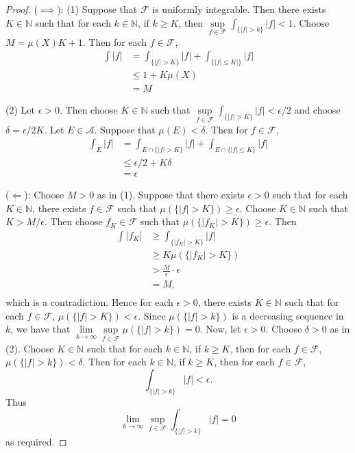 \documentclass[12pt]{amsart}
\theoremstyle{definition}
\newcommand{\del}{\delta}
\newcommand{\ep}{\epsilon}
\newcommand{\N}{\mathbb{N}}
\newcommand{\MA}{\mathcal{A}}
\newcommand{\MF}{\mathcal{F}}
\begin{document}
	\begin{proof}
		($\implies$): (1) Suppose that $\MF$ is uniformly integrable. Then there exists $K \in \N$ such that for each $k \in \N$, if $k \geq K$, then $\sup\limits_{f \in \MF} \int_{\{|f|>k\}} |f| < 1$. Choose $M = \mu(X)K + 1$. Then for each $f \in \MF$, 
		\begin{align*}
			\int |f| 
			&= \int_{\{|f|>K\}} |f| + \int_{\{|f| \leq K|\}}|f|\\
			& \leq 1 + K\mu(X)\\
			&=M
		\end{align*}
		
		(2) Let $\ep >0$. Then choose $K \in \N$ such that $\sup\limits_{f \in \MF}\int_{\{|f|>K\}} |f| < \ep/2$ and choose $\del = \ep/2K$. Let $E \in \MA$. Suppose that $\mu(E) < \del$. Then for $f \in \MF$, 
		\begin{align*}
			\int_E |f| 
			&= \int_{E \cap \{|f| > K\}} |f| + \int_{E \cap \{|f| \leq K\}} |f|\\
			& \leq \ep/2 + K\del \\
			&=  \ep
		\end{align*}
		
		($\Leftarrow$): Choose $M >0$ as in (1). Suppose that there exists $\ep >0$ such that for each $K \in \N$, there exists $f \in \MF$ such that $\mu(\{|f| > K\}) \geq \ep$. Choose $K \in \N$ such that $K > M/\ep$. Then choose $f_K \in \MF$ such that $\mu(\{|f_K| > K\}) \geq \ep$. Then 
		\begin{align*}
			\int |f_K| 
			&\geq \int_{\{|f_K| > K\}} |f|\\
			& \geq K\mu(\{|f_K| > K\})\\
			& > \frac{M}{\ep} \cdot \ep\\
			&= M, \\
		\end{align*}  
		which is a contradiction. Hence for each $\ep >0$, there exists $K \in \N$ such that for each $f \in \MF$, $\mu(\{|f| > K\}) < \ep$. Since $\mu(\{|f| > k\})$ is a decreasing sequence in $k$, we have that $\lim\limits_{k \rightarrow \infty} \sup\limits_{f \in \MF} \mu(\{|f| > k\}) = 0$. Now, let $\ep > 0$. Choose $\del >0$ as in (2). Choose $K \in \N$ such that for each $k \in \N$, if $k \geq K$, then for each $f \in \MF$, $\mu(\{|f| > k\}) < \del$. Then for each $k \in \N$, if $k \geq K$, then for each $f \in \MF$, 
		$$\int_{\{|f| > k\}} |f| < \ep.$$ Thus $$\lim\limits_{k \rightarrow \infty} \sup\limits_{f \in \MF} \int_{\{|f|>k\}} |f| = 0$$ as required.
		
	\end{proof}
	
\end{document}
